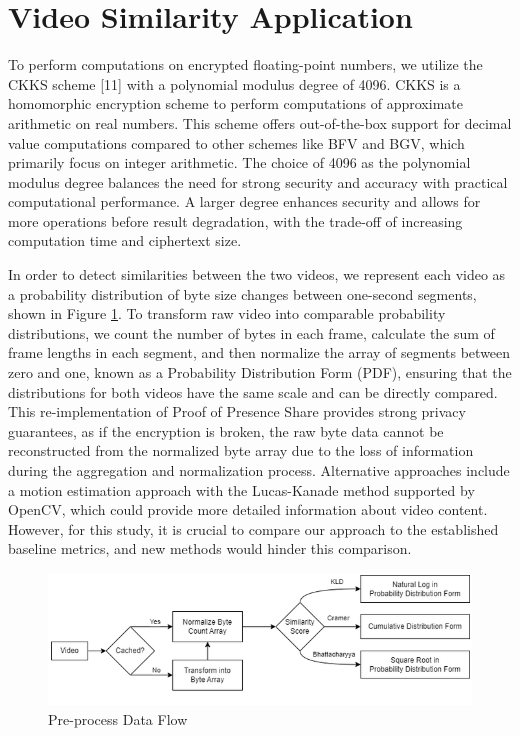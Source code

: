 \section{Video Similarity Application}
\label{sec: Video Similarity Application}
To perform computations on encrypted floating-point numbers, we utilize the CKKS scheme [11] with a polynomial modulus degree of 4096. CKKS is a homomorphic encryption scheme to perform computations of approximate arithmetic on real numbers. This scheme offers out-of-the-box support for decimal value computations compared to other schemes like BFV and BGV, which primarily focus on integer arithmetic. The choice of 4096 as the polynomial modulus degree balances the need for strong security and accuracy with practical computational performance. A larger degree enhances security and allows for more operations before result degradation, with the trade-off of increasing computation time and ciphertext size.

In order to detect similarities between the two videos, we represent each video as a probability distribution of byte size changes between one-second segments, shown in Figure \ref{fig:preprocess-data-flow}. To transform raw video into comparable probability distributions, we count the number of bytes in each frame, calculate the sum of frame lengths in each segment, and then normalize the array of segments between zero and one, known as a Probability Distribution Form (PDF), ensuring that the distributions for both videos have the same scale and can be directly compared. This re-implementation of Proof of Presence Share \cite{Lagesse2021-PopShare} provides strong privacy guarantees, as if the encryption is broken, the raw byte data cannot be reconstructed from the normalized byte array due to the loss of information during the aggregation and normalization process. Alternative approaches include a motion estimation approach with the Lucas-Kanade method \cite{Lucas1981-uy} supported by OpenCV, which could provide more detailed information about video content. However, for this study, it is crucial to compare our approach to the established baseline metrics, and new methods would hinder this comparison.

\begin{figure}[t]
    \centering
    \includegraphics[width=\textwidth]{4 Design/4.3 Preprocess Data Flow.png}
    \caption{Pre-process Data Flow}
    \label{fig:preprocess-data-flow}
\end{figure}

